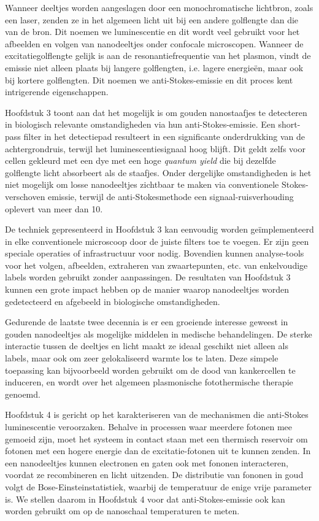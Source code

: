 {Wanneer deeltjes worden aangeslagen door een monochromatische lichtbron, zoals
een laser, zenden ze in het algemeen licht uit bij een andere golflengte dan die
van de bron. Dit noemen we luminescentie en dit wordt veel gebruikt voor het
afbeelden en volgen van nanodeeltjes onder confocale microscopen. Wanneer de
excitatiegolflengte gelijk is aan de resonantiefrequentie van het plasmon, vindt
de emissie niet alleen plaats bij langere golflengten, i.e. lagere
energie\"{e}n, maar ook bij kortere golflengten. Dit noemen we
anti-Stokes-emissie en dit proces kent intrigerende eigenschappen.

Hoofdstuk 3 toont aan dat het mogelijk is om gouden nanostaafjes te detecteren
in biologisch relevante omstandigheden via hun anti-Stokes-emissie. Een
short-pass filter in het detectiepad resulteert in een significante
onderdrukking van de achtergrondruis, terwijl het luminescentiesignaal hoog
blijft. Dit geldt zelfs voor cellen gekleurd met een dye met een hoge
\textit{quantum yield} die bij dezelfde golflengte licht absorbeert als de
staafjes. Onder dergelijke omstandigheden is het niet mogelijk om losse
nanodeeltjes zichtbaar te maken via conventionele Stokes-verschoven emissie,
terwijl de anti-Stokesmethode een signaal-ruisverhouding oplevert van meer dan
10.

De techniek gepresenteerd in Hoofdstuk 3 kan eenvoudig worden
ge\"{i}mplementeerd in elke conventionele microscoop door de juiste filters toe
te voegen. Er zijn geen speciale operaties of infrastructuur voor nodig. Bovendien kunnen analyse-tools
voor het volgen, afbeelden, extraheren van zwaartepunten, etc. van enkelvoudige
labels worden gebruikt zonder aanpassingen. De resultaten van Hoofdstuk 3 kunnen
een grote impact hebben op de manier waarop nanodeeltjes worden gedetecteerd en
afgebeeld in biologische omstandigheden. 

Gedurende de laatste twee decennia is er een groeiende interesse geweest in
gouden nanodeeltjes als mogelijke middelen in medische behandelingen. De sterke
interactie tussen de deeltjes en licht maakt ze ideaal geschikt niet alleen als
labels, maar ook om zeer gelokaliseerd warmte los te laten. Deze simpele
toepassing kan bijvoorbeeld worden gebruikt om de dood van kankercellen te
induceren, en wordt over het algemeen plasmonische fotothermische therapie
genoemd.

Hoofdstuk 4 is gericht op het karakteriseren van de mechanismen die
anti-Stokes luminescentie veroorzaken. Behalve in processen waar
meerdere fotonen mee gemoeid zijn, moet het systeem in contact staan met een thermisch reservoir
om fotonen met een hogere energie dan de excitatie-fotonen uit te kunnen zenden.
In een nanodeeltjes kunnen electronen en gaten ook met fononen interacteren,
voordat ze recombineren en licht uitzenden. De distributie van fononen in goud
volgt de Bose-Einsteinstatistiek, waarbij de temperatuur de enige vrije
parameter is. We stellen daarom in Hoofdstuk 4 voor dat anti-Stokes-emissie ook
kan worden gebruikt om op de nanoschaal temperaturen te meten. 

}
